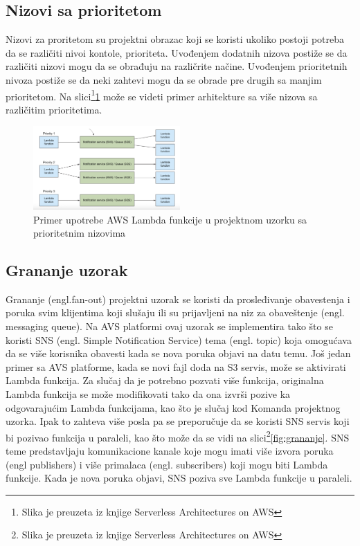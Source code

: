\documentclass[12pt,oneside]{memoir}
\begin{document}
\subsection{Nizovi sa prioritetom}
Nizovi za proritetom su projektni obrazac koji se koristi ukoliko postoji potreba da se različiti nivoi kontole, prioriteta. Uvođenjem dodatnih nizova postiže se da različiti nizovi mogu da se obrađuju na različrite načine. Uvođenjem prioritetnih nivoza postiže se da neki zahtevi mogu da se obrade pre drugih sa manjim prioritetom. Na slici\footnote{Slika je preuzeta iz knjige Serverless Architectures on AWS}\ref{fig:nizovi} može se videti primer arhitekture sa više nizova sa različitim prioritetima.

\begin{figure}[!ht]
  \centering
  \includegraphics[width=0.5\textwidth]{Slika 14.png}
  \caption{Primer upotrebe AWS Lambda funkcije u projektnom uzorku sa prioritetnim nizovima}
  \label{fig:nizovi}
\end{figure}
 
\subsection{Grananje uzorak} %
Grananje (engl.fan-out) projektni uzorak se koristi da prosleđivanje obavestenja i poruka svim klijentima koji slušaju ili su prijavljeni na niz za obaveštenje (engl. messaging queue). Na AVS platformi ovaj uzorak se implementira tako što se koristi SNS (engl. Simple Notification Service) tema (engl. topic) koja omogućava da se više korisnika obavesti kada se nova poruka objavi na datu temu. Još jedan primer sa AVS platforme, kada se novi fajl doda na S3 servis, može se aktivirati Lambda funkcija. Za slučaj da je potrebno pozvati više funkcija, originalna Lambda funkcija se može modifikovati tako da ona izvrši pozive ka odgovarajućim Lambda funkcijama, kao što je slučaj kod Komanda projektnog uzorka. Ipak to zahteva više posla pa se preporučuje da se koristi SNS servis koji bi pozivao funkcija u paraleli, kao što može da se vidi na slici\footnote{Slika je preuzeta iz knjige Serverless Architectures on AWS}\ref{fig:grananje}. SNS teme predstavljaju komunikacione kanale koje mogu imati više izvora poruka (engl publishers) i više primalaca (engl. subscribers) koji mogu biti Lambda funkcije. Kada je nova poruka objavi, SNS poziva sve Lambda funkcije u paraleli.
\end{document}
